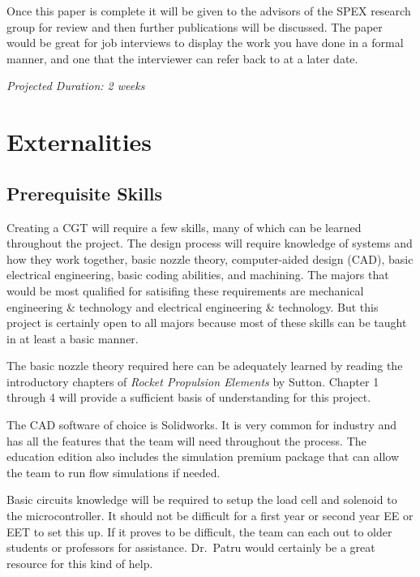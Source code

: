 \documentclass[conference]{IEEEtran} %
\begin{document}
    Once this paper is complete it will be given to the advisors of the SPEX research group for review and then further publications will be discussed. The paper would
    be great for job interviews to display the work you have done in a formal manner, and one that the interviewer can refer back to at a later date.

    \textit{Projected Duration: 2 weeks}

\section{Externalities}
\subsection{Prerequisite Skills}

Creating a CGT will require a few skills, many of which can be learned throughout the project. The design process will require knowledge of systems and how they
work together, basic nozzle theory, computer-aided design (CAD), basic electrical engineering, basic coding abilities, and machining. The majors that would
be most qualified for satisifing these requirements are mechanical engineering \& technology and electrical engineering \& technology. But this project is certainly
open to all majors because most of these skills can be taught in at least a basic manner.

The basic nozzle theory required here can be adequately learned by reading the introductory chapters of \textit{Rocket Propulsion Elements} by Sutton\cite{RPE}. Chapter 1 through 4 will
provide a sufficient basis of understanding for this project.

The CAD software of choice is Solidworks. It is very common for industry and has all the features that the team
will need throughout the process. The education edition also includes the simulation premium package that can allow the team to run flow simulations if needed.

Basic circuits knowledge will be required to setup the load cell and solenoid to the microcontroller. It
should not be difficult for a first year or second year EE or EET to set this up. If it proves to be difficult, the team can each out to older students or professors for assistance.
Dr.\ Patru would certainly be a great resource for this kind of help.
\end{document}

